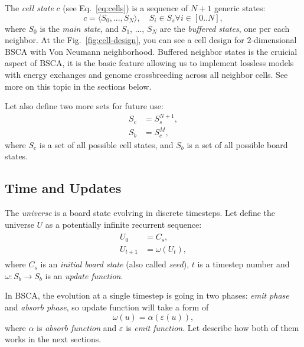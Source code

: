 \documentclass[a4paper,12pt,tikz,UTF8]{article}
\begin{document}
    The \textit{cell state} $c$ (see Eq.~\ref{eq:cells}) is a sequence of $N + 1$ generic states:
    \begin{equation}
      \label{eq:cell-state}
      c = \langle S_0, ..., S_N \rangle, \quad S_i \in S_s \forall i \in {[0 .. N]},
    \end{equation}
    where $S_0$ is the \textit{main state}, and $S_1$, ..., $S_N$ are the \textit{buffered states}, one per each neighbor. At the Fig.~\ref{fig:cell-design}, you can see a cell design for 2-dimensional BSCA with Von Neumann neighborhood. Buffered neighbor states is the cruicial aspect of BSCA, it is the basic feature allowing us to implement lossless models with energy exchanges and genome crossbreeding across all neighbor cells. See more on this topic in the sections below.

    Let also define two more sets for future use:
    \begin{align}
      S_c &= S_s^{N + 1},\\
      S_b &= S_c^M,
    \end{align}
    where $S_c$ is a set of all possible cell states, and $S_b$ is a set of all possible board states.

  \subsection{Time and Updates}

    The \textit{universe} is a board state evolving in discrete timesteps. Let define the universe $U$ as a potentially infinite recurrent sequence:
    \begin{align}
      \begin{split}
        U_0 &= C_s,\\
        U_{t + 1} &= \omega(U_t),
      \end{split}
    \end{align}
    where $C_s$ is an \textit{initial board state} (also called \textit{seed}), $t$ is a timestep number and $\omega: S_b \to S_b$ is an \textit{update function}.

    In BSCA, the evolution at a single timestep is going in two phases: \textit{emit phase} and \textit{absorb phase}, so update function will take a form of
    \begin{equation}
      \omega(u) = \alpha(\varepsilon(u)),
    \end{equation}
    where $\alpha$ is \textit{absorb function} and $\varepsilon$ is \textit{emit function}. Let describe how both of them works in the next sections.
\end{document}
